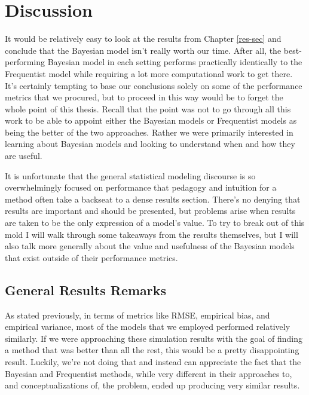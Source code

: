 \documentclass[12pt,twoside]{reedthesis}
\begin{document}
\hypertarget{conc}{%
\chapter{Discussion}\label{conc}}

It would be relatively easy to look at the results from Chapter \ref{res-sec} and conclude that the Bayesian model isn't really worth our time. After all, the best-performing Bayesian model in each setting performs practically identically to the Frequentist model while requiring a lot more computational work to get there. It's certainly tempting to base our conclusions solely on some of the performance metrics that we procured, but to proceed in this way would be to forget the whole point of this thesis. Recall that the point was not to go through all this work to be able to appoint either the Bayesian models or Frequentist models as being the better of the two approaches. Rather we were primarily interested in learning about Bayesian models and looking to understand when and how they are useful.

It is unfortunate that the general statistical modeling discourse is so overwhelmingly focused on performance that pedagogy and intuition for a method often take a backseat to a dense results section. There's no denying that results are important and should be presented, but problems arise when results are taken to be the only expression of a model's value. To try to break out of this mold I will walk through some takeaways from the results themselves, but I will also talk more generally about the value and usefulness of the Bayesian models that exist outside of their performance metrics.

\hypertarget{general-results-remarks}{%
\section{General Results Remarks}\label{general-results-remarks}}

As stated previously, in terms of metrics like RMSE, empirical bias, and empirical variance, most of the models that we employed performed relatively similarly. If we were approaching these simulation results with the goal of finding a method that was better than all the rest, this would be a pretty disappointing result. Luckily, we're not doing that and instead can appreciate the fact that the Bayesian and Frequentist methods, while very different in their approaches to, and conceptualizations of, the problem, ended up producing very similar results.
\end{document}
